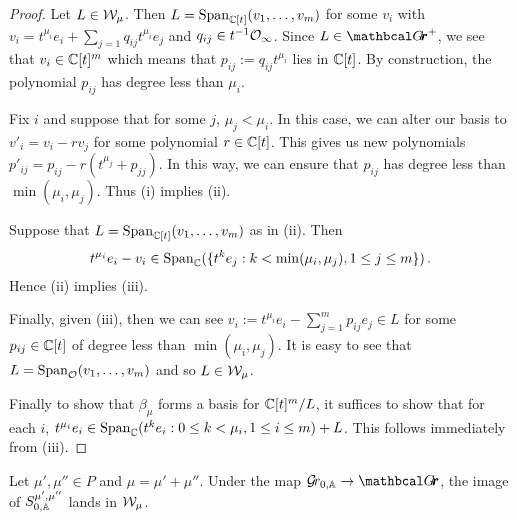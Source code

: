 \documentclass[draft]{article}
\begin{document}
\begin{proof}
    Let $ L \in \cW_\mu$.  Then $ L = \Sp_{\CC[t]}(v_1, \dots, v_m) $ for some $ v_i $ with $ v_i = t^{\mu_i} e_i + \sum_{j=1} q_{ij}t^{\mu_i} e_j $ and $ q_{ij} \in t^{-1} \Oinf$.  Since $ L \in \Grth^+ $, we see that $ v_i \in \CC[t]^m$ which means that $ p_{ij} := q_{ij}t^{\mu_i} $ lies in $ \CC[t]$.  By construction, the polynomial $ p_{ij}$ has degree less than $ \mu_i$.
    
    Fix $ i$ and suppose that for some $ j$, $ \mu_j < \mu_i$.  In this case, we can alter our basis to $ v'_i = v_i - r v_j$ for some polynomial $r \in \CC[t]$.  This gives us new polynomials $ p'_{ij} = p_{ij} - r (t^{\mu_j} + p_{jj}) $.  In this way, we can ensure that $ p_{ij} $ has degree less than $ \min(\mu_i, \mu_j)$.  Thus (i) implies (ii).
    
    Suppose that $ L = \Sp_{\CC[t]}(v_1, \dots, v_m)$ as in (ii).  Then
    $$t^{\mu_i} e_i - v_i \in \Sp_\CC(\{t^k e_j :  k < \min(\mu_i, \mu_j), 1 \le j \le m \})  \,. $$
    Hence (ii) implies (iii).  

    Finally, given (iii), then we can see $ v_i := t^{\mu_i} e_i - \sum_{j=1}^m p_{ij} e_j \in L $ for some $ p_{ij} \in \CC[t]$ of degree less than $ \min(\mu_i,\mu_j) $.  It is easy to see that $ L = \Sp_\cO(v_1, \dots, v_m) $ and so $ L \in \cW_\mu$.  
    
    Finally to show that $ \beta_\mu$ forms a basis for $ \CC[t]^m/L$, it suffices to show that for each $ i$, $ t^{\mu_i} e_i  \in \Sp_\CC(  t^k e_i : 0 \le k < \mu_i, 1 \le i \le m) + L$. 
    This follows immediately from (iii).
\end{proof}
% 
\begin{lemma}
\label{le:inftyfusiskl} %
    Let $\mu',\mu'' \in P$ and $\mu = \mu' + \mu''$. Under the map $ \Grbd \rightarrow \Grth$, the image of $ S^{\mu', \mu''}_{0,\AA}$ lands in $ \cW_\mu$.
\end{lemma}
\end{document}
